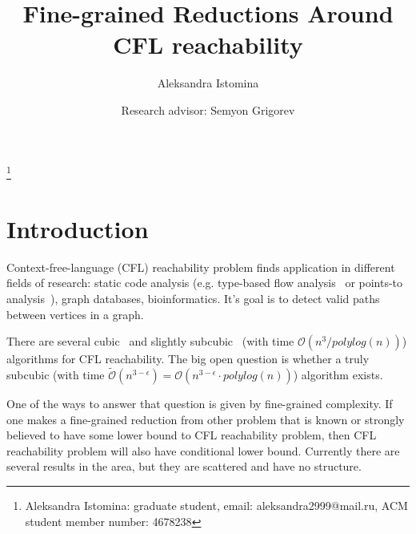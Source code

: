\documentclass[acmsmall,review,nonacm]{acmart}\settopmatter{printfolios=true,printccs=false,printacmref=false}
\begin{document}
	
	\title{Fine-grained Reductions Around CFL reachability}
	
	\author{Aleksandra Istomina}
	\thanks{Aleksandra Istomina: graduate student, email: aleksandra2999@mail.ru, ACM student member number: 4678238}

    \author{Research advisor: Semyon Grigorev}
	
	\newcommand\todo[1]{{\color{violet}#1}}
	\newcommand\db[1]{{\color{red}#1}}
	\newcommand\question[1]{{\color{cyan}#1}}


	\maketitle
	
	\section{Introduction}
	
	Context-free-language (CFL) reachability problem finds application in different fields of research: static code analysis (e.g. type-based flow analysis~\cite{10.1145/373243.360208} or points-to analysis~\cite{10.1145/1103845.1094817, 10.1145/1133255.1134027}), graph databases, bioinformatics. It's goal is to detect valid paths between vertices in a graph. 
	
	There are several cubic~\cite{10.1145/298514.298576, 10.1145/199448.199462} and slightly subcubic~\cite{10.1145/1328438.1328460} (with time $\mathcal{O}(n^{3} / polylog(n))$) algorithms for CFL reachability. The big open question is whether a truly subcubic (with time $\tilde{\mathcal{O}}(n^{3 - \epsilon}) = \mathcal{O}(n^{3 - \epsilon} \cdot polylog(n))$) algorithm exists. 
	
	One of the ways to answer that question is given by fine-grained complexity. If one makes a fine-grained reduction from other problem that is known or strongly believed to have some lower bound to CFL reachability problem, then CFL reachability problem will also have conditional lower bound. Currently there are several results in the area, but they are scattered and have no structure.
	
\end{document}
